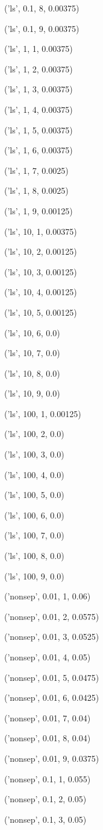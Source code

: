 \documentclass{paper}
\begin{document}
\begin{enumerate}
('ls', 0.1, 8, 0.00375)

('ls', 0.1, 9, 0.00375)

('ls', 1, 1, 0.00375)

('ls', 1, 2, 0.00375)

('ls', 1, 3, 0.00375)

('ls', 1, 4, 0.00375)

('ls', 1, 5, 0.00375)

('ls', 1, 6, 0.00375)

('ls', 1, 7, 0.0025)

('ls', 1, 8, 0.0025)

('ls', 1, 9, 0.00125)

('ls', 10, 1, 0.00375)

('ls', 10, 2, 0.00125)

('ls', 10, 3, 0.00125)

('ls', 10, 4, 0.00125)

('ls', 10, 5, 0.00125)

('ls', 10, 6, 0.0)

('ls', 10, 7, 0.0)

('ls', 10, 8, 0.0)

('ls', 10, 9, 0.0)

('ls', 100, 1, 0.00125)

('ls', 100, 2, 0.0)

('ls', 100, 3, 0.0)

('ls', 100, 4, 0.0)

('ls', 100, 5, 0.0)

('ls', 100, 6, 0.0)

('ls', 100, 7, 0.0)

('ls', 100, 8, 0.0)

('ls', 100, 9, 0.0)

('nonsep', 0.01, 1, 0.06)

('nonsep', 0.01, 2, 0.0575)

('nonsep', 0.01, 3, 0.0525)

('nonsep', 0.01, 4, 0.05)

('nonsep', 0.01, 5, 0.0475)

('nonsep', 0.01, 6, 0.0425)

('nonsep', 0.01, 7, 0.04)

('nonsep', 0.01, 8, 0.04)

('nonsep', 0.01, 9, 0.0375)

('nonsep', 0.1, 1, 0.055)

('nonsep', 0.1, 2, 0.05)

('nonsep', 0.1, 3, 0.05)


\end{enumerate}
\end{document}
